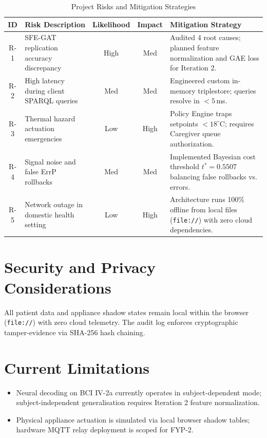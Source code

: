 \documentclass[12pt,a4paper]{report}
\begin{document}
\begin{table}[H]
\centering
\small
\caption{Project Risks and Mitigation Strategies}
\label{tab:risks}
\begin{tabularx}{\textwidth}{c p{3.5cm} c c X}
\toprule
\textbf{ID} & \textbf{Risk Description} & \textbf{Likelihood} & \textbf{Impact} & \textbf{Mitigation Strategy} \\
\midrule
R-1 & SFE-GAT replication accuracy discrepancy & High & Med & Audited 4 root causes; planned feature normalization and GAE loss for Iteration 2. \\
\addlinespace
R-2 & High latency during client SPARQL queries & Med & Med & Engineered custom in-memory triplestore; queries resolve in $< 5$\,ms. \\
\addlinespace
R-3 & Thermal hazard actuation emergencies & Low & High & Policy Engine traps setpoints $< 18^\circ\text{C}$; requires Caregiver queue authorization. \\
\addlinespace
R-4 & Signal noise and false ErrP rollbacks & Med & Med & Implemented Bayesian cost threshold $t^* = 0.5507$ balancing false rollbacks vs. errors. \\
\addlinespace
R-5 & Network outage in domestic health setting & Low & High & Architecture runs 100\% offline from local files (\texttt{file://}) with zero cloud dependencies. \\
\bottomrule
\end{tabularx}
\end{table}

\section{Security and Privacy Considerations}
All patient data and appliance shadow states remain local within the browser (\texttt{file://}) with zero cloud telemetry. The audit log enforces cryptographic tamper-evidence via SHA-256 hash chaining.

\section{Current Limitations}
\begin{itemize}[leftmargin=1.5em]
    \item Neural decoding on BCI IV-2a currently operates in subject-dependent mode; subject-independent generalisation requires Iteration 2 feature normalization.
    \item Physical appliance actuation is simulated via local browser shadow tables; hardware MQTT relay deployment is scoped for FYP-2.
\end{itemize}
\end{document}
